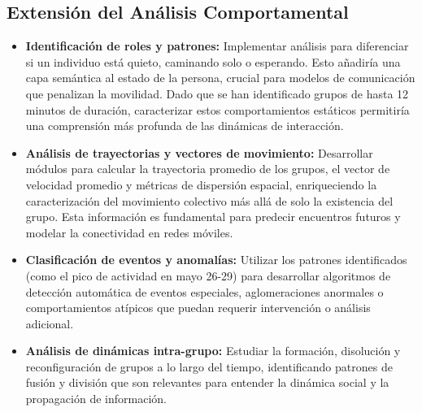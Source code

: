 \subsection{Extensión del Análisis Comportamental}
\begin{itemize}
	\item \textbf{Identificación de roles y patrones:} Implementar análisis para diferenciar si un individuo está quieto, caminando solo o esperando. Esto añadiría una capa semántica al estado de la persona, crucial para modelos de comunicación que penalizan la movilidad. Dado que se han identificado grupos de hasta 12 minutos de duración, caracterizar estos comportamientos estáticos permitiría una comprensión más profunda de las dinámicas de interacción.
	
	\item \textbf{Análisis de trayectorias y vectores de movimiento:} Desarrollar módulos para calcular la trayectoria promedio de los grupos, el vector de velocidad promedio y métricas de dispersión espacial, enriqueciendo la caracterización del movimiento colectivo más allá de solo la existencia del grupo. Esta información es fundamental para predecir encuentros futuros y modelar la conectividad en redes móviles.
	
	\item \textbf{Clasificación de eventos y anomalías:} Utilizar los patrones identificados (como el pico de actividad en mayo 26-29) para desarrollar algoritmos de detección automática de eventos especiales, aglomeraciones anormales o comportamientos atípicos que puedan requerir intervención o análisis adicional.
	
	\item \textbf{Análisis de dinámicas intra-grupo:} Estudiar la formación, disolución y reconfiguración de grupos a lo largo del tiempo, identificando patrones de fusión y división que son relevantes para entender la dinámica social y la propagación de información.
\end{itemize}

